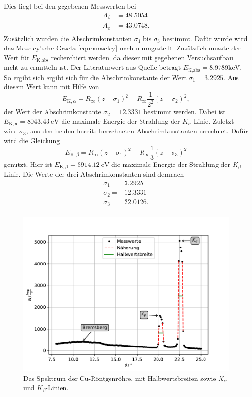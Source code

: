 Dies liegt bei den gegebenen Messwerten bei 
\begin{align*}
    A_\beta &= 48.5054 \\
    A_\alpha &=  43.0748. \\
\end{align*}
Zusätzlich wurden die Abschrimkonstanten $\sigma_1$ bis $\sigma_3$ bestimmt.
Dafür wurde wird das Moseley'sche Gesetz \eqref{eqn:moseley} nach $\sigma$ umgestellt.
Zusätzlich musste der Wert für $E_\text{K,abs}$ recherchiert werden, da dieser mit gegebenen Versuchsaufbau nicht zu ermitteln ist.
Der Literaturwert aus Quelle \cite{xray} beträgt $E_\text{K,abs} = 8.9789 \si{\kilo\eV}$. 
So ergibt sich ergibt sich für die Abschrimkonstante der Wert $\sigma_1 = 3.2925$.
Aus diesem Wert kann mit Hilfe von
\begin{equation*}
  E_{\text{K},\alpha} = R_\infty (z-\sigma_1)^2 - R_\infty \frac{1}{2^2}(z-\sigma_2)^2,
\end{equation*}
der Wert der Abschrimkonstante $\sigma_2 = 12.3331$ bestimmt werden.
Dabei ist $E_{\text{K},\alpha} = \SI{8043.43}{\eV}$ die maximale Energie der Strahlung der $K_\alpha$-Linie.
Zuletzt wird $\sigma_3$, aus den beiden bereits berechneten Abschrimkonstanten errechnet.
Dafür wird die Gleichung 
\begin{equation*}
  E_{\text{K},\beta} = R_\infty (z-\sigma_1)^2 - R_\infty \frac{1}{3}(z-\sigma_3)^2
\end{equation*}
genutzt.
Hier ist $E_{\text{K},\beta} = \SI{8914.12}{\eV}$ die maximale Energie der Strahlung der $K_\beta$-Linie.
Die Werte der drei Abschrimkonstanten sind demnach 
\begin{align*}
\sigma_1 =& 3.2925 \\
\sigma_2 =& 12.3331 \\
\sigma_3 =& 22.0126. \\
\end{align*}

\begin{figure}
  \centering
  \includegraphics[width=\textwidth]{content/data/spektrum.pdf}
  \caption{Das Spektrum der Cu-Röntgenröhre, mit Halbwertsbreiten sowie $K_\alpha$ und $K_\beta$-Linien.}
  \label{fig:emis}
\end{figure}


